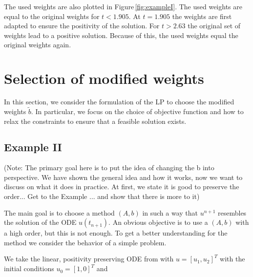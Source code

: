 \documentclass[a4paper]{article}
\numberwithin{equation}{section}
\theoremstyle{plain}
\theoremstyle{definition}
\numberwithin{theorem}{section}
\newcommand{\1}{\mathbbm{1}}
\newcommand{\bt}{\tilde{b}}
\begin{document}
The used weights are also plotted in Figure\,\ref{fig:exampleI}. 
The used weights are equal to the original weights for $t<1.905$. At $t=1.905$ the weights are first adapted to ensure the positivity of the solution. For $t>2.63$ the original set of weights lead to a positive solution. Because of this, the used weights equal the original weights again.


\section{Selection of modified weights}\label{sec:LP}

In this section, we consider the formulation of the LP to choose
the modified weights $\bt$.  In particular, we focus on the choice
of objective function and how to relax the constraints to ensure that
a feasible solution exists.

\subsection{Example II}\label{sec:example_lin}

(Note: The primary goal here is to put the idea of changing the b into perspective. We have shown the general idea and how it works, now we want to discuss on what it does in practice. At first, we state it is good to preserve the order... Get to the Example ... and show that there is more to it)

The main goal is to choose a method $(A,b)$ in such a way that $u^{n+1}$ resembles the solution of the ODE $u(t_{n+1})$.
An obvious objective is to use a $(A,b)$ with a high order, but this is not enough.
To get a better understanding for the method we consider the behavior of a simple problem.   

We take the linear, positivity preserving ODE from \cite{kopecz_unconditionally_2018} with $u = [u_1,u_2]^T$ with the initial conditions $u_0 = [1,0]^T$ and
\end{document}
